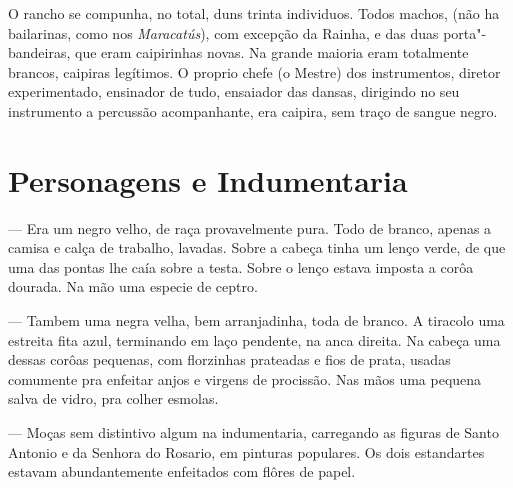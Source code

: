 O rancho se compunha, no total, duns trinta individuos. Todos machos,
(não ha bailarinas, como nos \emph{Maracatús}), com excepção da Rainha,
e das duas porta"-bandeiras, que eram caipirinhas novas. Na grande
maioria eram totalmente brancos, caipiras legítimos. O proprio chefe (o
Mestre) dos instrumentos, diretor experimentado, ensinador de tudo,
ensaiador das dansas, dirigindo no seu instrumento a percussão
acompanhante, era caipira, sem traço de sangue negro.

\section{Personagens e Indumentaria}

 --- Era um negro velho, de raça provavelmente pura. Todo de
branco, apenas a camisa e calça de trabalho, lavadas. Sobre a cabeça
tinha um lenço verde, de que uma das pontas lhe caía sobre a testa.
Sobre o lenço estava imposta a corôa dourada. Na mão uma especie de
ceptro.

 --- Tambem uma negra velha, bem arranjadinha, toda de
branco. A tiracolo uma estreita fita azul, terminando em laço pendente,
na anca direita. Na cabeça uma dessas corôas pequenas, com florzinhas
prateadas e fios de prata, usadas comumente pra enfeitar anjos e virgens
de procissão. Nas mãos uma pequena salva de vidro, pra colher esmolas.

 --- Moças sem distintivo algum na
indumentaria, carregando as figuras de Santo Antonio e da Senhora do
Rosario, em pinturas populares. Os dois estandartes estavam
abundantemente enfeitados com flôres de papel.

